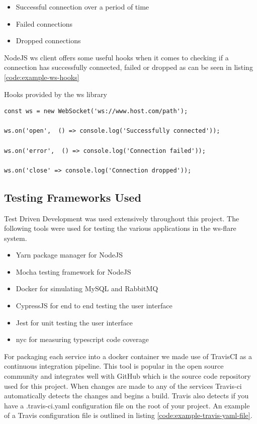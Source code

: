 \begin{itemize}
  \item Successful connection over a period of time
  \item Failed connections
  \item Dropped connections
\end{itemize}

NodeJS ws client offers some useful hooks when it comes to checking if a connection has successfully connected, failed or dropped as can be seen in listing \ref{code:example-ws-hooks}

\begin{listing}[H]
    \caption{Hooks provided by the ws library}
    \label{code:example-ws-hooks}
\begin{verbatim}
const ws = new WebSocket('ws://www.host.com/path');
 
ws.on('open',  () => console.log('Successfully connected'));

ws.on('error',  () => console.log('Connection failed'));

ws.on('close' => console.log('Connection dropped'));
\end{verbatim}
\end{listing}

\subsection{Testing Frameworks Used}

Test Driven Development was used extensively throughout this project. The following tools were used for testing the various applications in the ws-flare system.

\begin{itemize}
  \item Yarn package manager for NodeJS 
  \item Mocha testing framework for NodeJS
  \item Docker for simulating MySQL and RabbitMQ
  \item CypressJS for end to end testing the user interface
  \item Jest for unit testing the user interface
  \item nyc for measuring typescript code coverage
\end{itemize}

For packaging each service into a docker container we made use of TravisCI \cite{travisCI} as a continuous integration pipeline. This tool is popular in the open source community and integrates well with GitHub which is the source code repository used for this project. When changes are made to any of the services Travis-ci automatically detects the changes and begins a build. Travis also detects if you have a .travis-ci.yaml configuration file on the root of your project. An example of a Travis configuration file is outlined in listing \ref{code:example-travis-yaml-file}.

